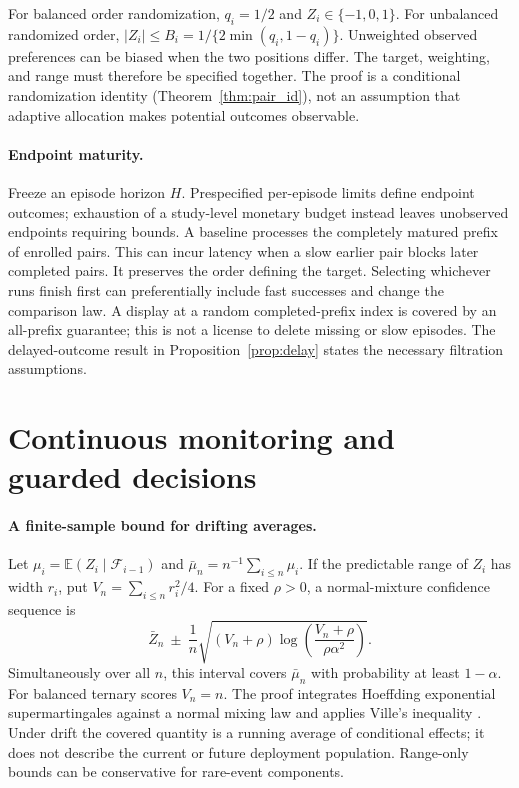 \documentclass[11pt,letterpaper]{article}
\newcommand{\E}{\mathbb E}
\begin{document}
For balanced order randomization, $q_i=1/2$ and $Z_i\in\{-1,0,1\}$.
For unbalanced randomized order, $|Z_i|\leq
B_i=1/\{2\min(q_i,1-q_i)\}$. Unweighted observed preferences can be
biased when the two positions differ. The target, weighting, and range
must therefore be specified together. The proof is a conditional
randomization identity (Theorem~\ref{thm:pair_id}), not an assumption that
adaptive allocation makes potential outcomes observable.

\paragraph{Endpoint maturity.}
Freeze an episode horizon $H$. Prespecified per-episode limits define
endpoint outcomes; exhaustion of a study-level monetary budget instead
leaves unobserved endpoints requiring bounds. A baseline processes the completely matured prefix of enrolled pairs.
This can incur latency when a slow earlier pair blocks later completed
pairs. It preserves the order defining the target. Selecting whichever
runs finish first can preferentially include fast successes and change
the comparison law. A display at a random completed-prefix index is
covered by an all-prefix guarantee; this is not a license to delete
missing or slow episodes. The delayed-outcome result in
Proposition~\ref{prop:delay} states the necessary filtration assumptions.

\section{Continuous monitoring and guarded decisions}
\label{sec:monitoring}
\paragraph{A finite-sample bound for drifting averages.}
Let $\mu_i=\E(Z_i\mid\mathcal F_{i-1})$ and
$\bar\mu_n=n^{-1}\sum_{i\leq n}\mu_i$. If the predictable range of $Z_i$
has width $r_i$, put $V_n=\sum_{i\leq n}r_i^2/4$. For a fixed
$\rho>0$, a normal-mixture confidence sequence is
\begin{equation}
 \bar Z_n\ \pm\ \frac{1}{n}
 \sqrt{(V_n+\rho)\log\!\left(\frac{V_n+\rho}{\rho\alpha^2}\right)}.
 \label{eq:main_cs}
\end{equation}
Simultaneously over all $n$, this interval covers $\bar\mu_n$ with
probability at least $1-\alpha$. For balanced ternary scores $V_n=n$.
The proof integrates Hoeffding exponential supermartingales against a
normal mixing law and applies Ville's inequality
\citep{howard2021confidence}. Under drift the covered quantity is a
running average of conditional effects; it does not describe the current
or future deployment population. Range-only bounds can be conservative
for rare-event components.
\end{document}
